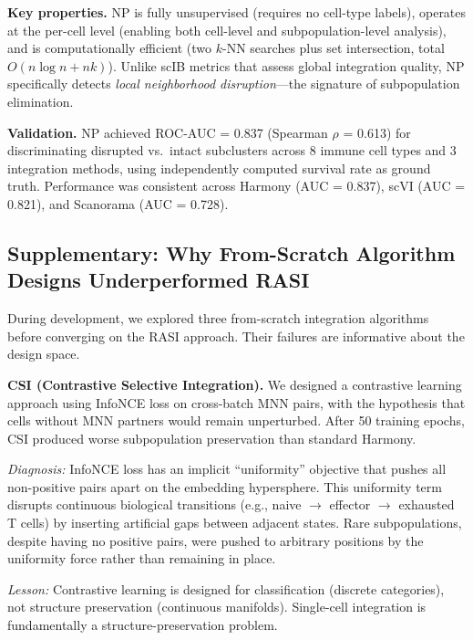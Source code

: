 \documentclass[10pt]{article}
\begin{document}
\textbf{Key properties.}
NP is fully unsupervised (requires no cell-type labels), operates at the per-cell level (enabling both cell-level and subpopulation-level analysis), and is computationally efficient (two $k$-NN searches plus set intersection, total $O(n \log n + nk)$). Unlike scIB metrics that assess global integration quality, NP specifically detects \textit{local neighborhood disruption}---the signature of subpopulation elimination.

\textbf{Validation.}
NP achieved ROC-AUC = 0.837 (Spearman $\rho$ = 0.613) for discriminating disrupted vs.\ intact subclusters across 8 immune cell types and 3 integration methods, using independently computed survival rate as ground truth. Performance was consistent across Harmony (AUC = 0.837), scVI (AUC = 0.821), and Scanorama (AUC = 0.728).


\subsection*{Supplementary: Why From-Scratch Algorithm Designs Underperformed RASI}

During development, we explored three from-scratch integration algorithms before converging on the RASI approach. Their failures are informative about the design space.

\textbf{CSI (Contrastive Selective Integration).}
We designed a contrastive learning approach using InfoNCE loss on cross-batch MNN pairs, with the hypothesis that cells without MNN partners would remain unperturbed. After 50 training epochs, CSI produced worse subpopulation preservation than standard Harmony.

\textit{Diagnosis:} InfoNCE loss has an implicit ``uniformity'' objective that pushes all non-positive pairs apart on the embedding hypersphere\cite{wang2020understanding}. This uniformity term disrupts continuous biological transitions (e.g., naive $\to$ effector $\to$ exhausted T cells) by inserting artificial gaps between adjacent states. Rare subpopulations, despite having no positive pairs, were pushed to arbitrary positions by the uniformity force rather than remaining in place.

\textit{Lesson:} Contrastive learning is designed for classification (discrete categories), not structure preservation (continuous manifolds). Single-cell integration is fundamentally a structure-preservation problem.
\end{document}
